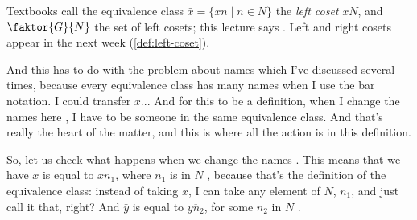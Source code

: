 \begin{proofWrapper}
\begin{content}

\end{content}

\begin{aiNote}
Textbooks call the equivalence class $\bar{x} = \{x n \mid n \in N\}$ the \emph{left coset} $x N$, and $\faktor{G}{N}$ the set of left cosets; this lecture says . Left and right cosets appear in the next week (\cref{def:left-coset}).
\end{aiNote}

\begin{speech}[00:59:08 - 01:00:08]
And this has to do with the problem about names which I've discussed several times, because every equivalence class has many names when I use the bar notation. I could transfer $x$... And for this to be a definition, when I change the names here , I have to be someone in the same equivalence class. And that's really the heart of the matter, and this is where all the action is in this definition.

So, let us check what happens when we change the names . This means that we have $\bar{x}$ is equal to $\overline{x n_1}$, where $n_1$ is in $N$ , because that's the definition of the equivalence class: instead of taking $x$, I can take any element of $N$, $n_1$, and just call it that, right? And $\bar{y}$ is equal to $\overline{y n_2}$, for some $n_2$ in $N$ .
\end{speech}


\end{proofWrapper}
